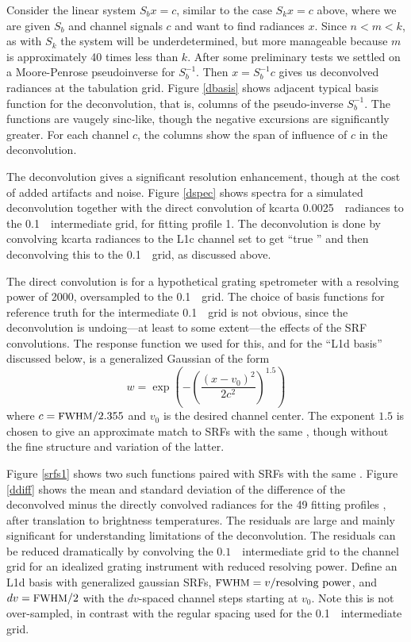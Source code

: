 \documentclass[11pt]{article}
\begin{document}
Consider the linear system $S_b x = c$, similar to the case $S_k x =
c$ above, where we are given $S_b$ and channel signals $c$ and want
to find radiances $x$.  Since $n < m < k$, as with $S_k$ the system
will be underdetermined, but more manageable because $m$ is
approximately 40 times less than $k$.  After some preliminary tests
we settled on a Moore-Penrose pseudoinverse for $S_b^{-1}$.  Then $x
= S_b^{-1} c$ gives us deconvolved radiances at the {\srf}
tabulation grid.  Figure \ref{dbasis} shows adjacent typical basis
function for the deconvolution, that is, columns of the
pseudo-inverse $S_b^{-1}$.  The functions are vaugely sinc-like,
though the negative excursions are significantly greater.  For each
channel $c$, the columns show the span of influence of $c$ in the
deconvolution.

The {\airs} deconvolution gives a significant resolution
enhancement, though at the cost of added artifacts and noise.
Figure \ref{dspec} shows spectra for a simulated deconvolution
together with the direct convolution of kcarta 0.0025~\wn\ radiances
to the 0.1~\wn\ intermediate grid, for fitting profile 1.  The
deconvolution is done by convolving kcarta radiances to the {\airs}
L1c channel set to get ``true {\airs}'' and then deconvolving this
to the 0.1~\wn\ grid, as discussed above.

The direct convolution is for a hypothetical grating spetrometer
with a resolving power of 2000, oversampled to the 0.1~\wn\ grid.
The choice of basis functions for reference truth for the
intermediate 0.1~\wn\ grid is not obvious, since the deconvolution
is undoing---at least to some extent---the effects of the {\airs}
SRF convolutions.  The response function we used for this, and for
the ``L1d basis'' discussed below, is a generalized Gaussian of the
form
\[w = \exp\left(-\left(\frac{(x - v_0)^2}{2c^2}\right)^{1.5}\right) \]
where $c=\mbox{\small FWHM} / 2.355$ and $v_0$ is the desired channel center.
The exponent $1.5$ is chosen to give an approximate match to {\airs}
SRFs with the same \fwhm, though without the fine structure and
variation of the latter.  

Figure \ref{srfs1} shows two such functions paired with {\airs} SRFs
with the same \fwhm.  Figure \ref{ddiff} shows the mean and standard
deviation of the difference of the deconvolved minus the directly
convolved radiances for the 49 fitting profiles \cite{sarta1,sarta2},
after translation to brightness temperatures.  The residuals are
large and mainly significant for understanding limitations of the
deconvolution.  The residuals can be reduced dramatically by
convolving the $0.1$~\wn\ intermediate grid to the channel grid for
an idealized grating instrument with reduced resolving power.  Define
an L1d basis with generalized gaussian SRFs, $\mbox{\small FWHM} = v /
\hbox{resolving power}$, and $dv = \mbox{\small FWHM} / 2$ with the $dv$-spaced
channel steps starting at $v_0$.  Note this is not over-sampled, in
contrast with the regular spacing used for the 0.1~\wn\ intermediate
grid.
\end{document}
